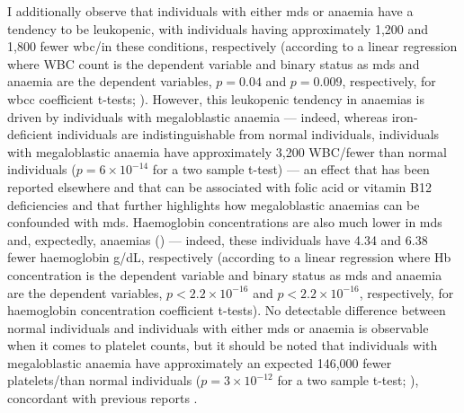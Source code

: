 \begin{figure}[!ht]
    \label{fig:mds-age}
\end{figure}

\begin{figure}[!ht]
    \label{fig:mds-sex}
\end{figure}

I additionally observe that individuals with either \ac{mds} or anaemia have a tendency to be leukopenic, with individuals having approximately 1,200 and 1,800 fewer \ac{wbc}/\Mum in these conditions, respectively (according to a linear regression where WBC count is the dependent variable and binary status as \ac{mds} and anaemia are the dependent variables, $p=0.04$ and $p=0.009$, respectively, for \ac{wbcc} coefficient t-tests; ). However, this leukopenic tendency in anaemias is driven by individuals with megaloblastic anaemia --- indeed, whereas iron-deficient individuals are indistinguishable from normal individuals, individuals with megaloblastic anaemia have approximately 3,200 WBC/\Mum fewer than normal individuals ($p=6 \times 10^{-14}$ for a two sample t-test) --- an effect that has been reported elsewhere and that can be associated with folic acid or vitamin B12 deficiencies \cite{Kaferle2009-pl,Castle1978-ky} and that further highlights how megaloblastic anaemias can be confounded with \ac{mds}. Haemoglobin concentrations are also much lower in \ac{mds} and, expectedly, anaemias () --- indeed, these individuals have 4.34 and 6.38 fewer haemoglobin g/dL, respectively (according to a linear regression where Hb concentration is the dependent variable and binary status as \ac{mds} and anaemia are the dependent variables, $p<2.2 \times 10^{-16}$ and $p<2.2 \times 10^{-16}$, respectively, for haemoglobin concentration coefficient t-tests). No detectable difference between normal individuals and individuals with either \ac{mds} or anaemia is observable when it comes to platelet counts, but it should be noted that individuals with megaloblastic anaemia have approximately an expected 146,000 fewer platelets/\Mum than normal individuals ($p=3 \times 10^{-12}$ for a two sample t-test; ), concordant with previous reports \cite{Castle1978-ky}. 

\begin{figure}[!ht]
    \label{fig:mds-wbcc}
\end{figure}

